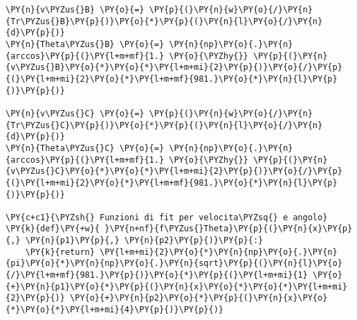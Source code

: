 \begin{Verbatim}[label=\makebox{\href{https://github.com/unipi-physics-labs/lab1-sheets/tree/main/snippy/plasduino_pendulum_testT.py}{https://github.com/.../plasduino\_pendulum\_testT.py}},commandchars=\\\{\}]
\PY{n}{v\PYZus{}B} \PY{o}{=} \PY{p}{(}\PY{n}{w}\PY{o}{/}\PY{n}{Tr\PYZus{}B}\PY{p}{)}\PY{o}{*}\PY{p}{(}\PY{n}{l}\PY{o}{/}\PY{n}{d}\PY{p}{)}
\PY{n}{Theta\PYZus{}B} \PY{o}{=} \PY{n}{np}\PY{o}{.}\PY{n}{arccos}\PY{p}{(}\PY{l+m+mf}{1.} \PY{o}{\PYZhy{}} \PY{p}{(}\PY{n}{v\PYZus{}B}\PY{o}{*}\PY{o}{*}\PY{l+m+mi}{2}\PY{p}{)}\PY{o}{/}\PY{p}{(}\PY{l+m+mi}{2}\PY{o}{*}\PY{l+m+mf}{981.}\PY{o}{*}\PY{n}{l}\PY{p}{)}\PY{p}{)}

\PY{n}{v\PYZus{}C} \PY{o}{=} \PY{p}{(}\PY{n}{w}\PY{o}{/}\PY{n}{Tr\PYZus{}C}\PY{p}{)}\PY{o}{*}\PY{p}{(}\PY{n}{l}\PY{o}{/}\PY{n}{d}\PY{p}{)}
\PY{n}{Theta\PYZus{}C} \PY{o}{=} \PY{n}{np}\PY{o}{.}\PY{n}{arccos}\PY{p}{(}\PY{l+m+mf}{1.} \PY{o}{\PYZhy{}} \PY{p}{(}\PY{n}{v\PYZus{}C}\PY{o}{*}\PY{o}{*}\PY{l+m+mi}{2}\PY{p}{)}\PY{o}{/}\PY{p}{(}\PY{l+m+mi}{2}\PY{o}{*}\PY{l+m+mf}{981.}\PY{o}{*}\PY{n}{l}\PY{p}{)}\PY{p}{)}

\PY{c+c1}{\PYZsh{} Funzioni di fit per velocita\PYZsq{} e angolo}
\PY{k}{def}\PY{+w}{ }\PY{n+nf}{f\PYZus{}Theta}\PY{p}{(}\PY{n}{x}\PY{p}{,} \PY{n}{p1}\PY{p}{,} \PY{n}{p2}\PY{p}{)}\PY{p}{:}
    \PY{k}{return} \PY{l+m+mi}{2}\PY{o}{*}\PY{n}{np}\PY{o}{.}\PY{n}{pi}\PY{o}{*}\PY{n}{np}\PY{o}{.}\PY{n}{sqrt}\PY{p}{(}\PY{n}{l}\PY{o}{/}\PY{l+m+mf}{981.}\PY{p}{)}\PY{o}{*}\PY{p}{(}\PY{l+m+mi}{1} \PY{o}{+}\PY{n}{p1}\PY{o}{*}\PY{p}{(}\PY{n}{x}\PY{o}{*}\PY{o}{*}\PY{l+m+mi}{2}\PY{p}{)} \PY{o}{+}\PY{n}{p2}\PY{o}{*}\PY{p}{(}\PY{n}{x}\PY{o}{*}\PY{o}{*}\PY{l+m+mi}{4}\PY{p}{)}\PY{p}{)}



\end{Verbatim}
